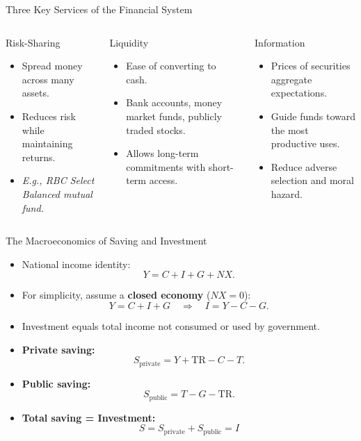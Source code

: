 \documentclass[aspectratio=169]{beamer}
\begin{document}
\begin{frame}{Three Key Services of the Financial System}
\transfade
\begin{columns}
\begin{block}{\centering \textcolor{accent}{Risk-Sharing}}
\begin{itemize}
  \item Spread money across many assets.
  \item Reduces risk while maintaining returns.
  \item \textit{E.g., RBC Select Balanced mutual fund.}
\end{itemize}
\end{block}
\begin{block}{\centering \textcolor{leafgreen}{Liquidity}}
\begin{itemize}
  \item Ease of converting to cash.
  \item Bank accounts, money market funds, publicly traded stocks.
  \item Allows long-term commitments with short-term access.
\end{itemize}
\end{block}
\begin{block}{\centering \textcolor{deeporange}{Information}}
\begin{itemize}
  \item Prices of securities aggregate expectations.
  \item Guide funds toward the most productive uses.
  \item Reduce adverse selection and moral hazard.
\end{itemize}
\end{block}
\end{columns}
\end{frame}


\begin{frame}{The Macroeconomics of Saving and Investment}
\transfade
\begin{itemize}
  \item National income identity:
  \[
    Y = C + I + G + NX.
  \]
  \item For simplicity, assume a \textbf{closed economy} ($NX = 0$):
  \[
    Y = C + I + G \quad \Rightarrow \quad I = Y - C - G.
  \]
  \item Investment equals total income not consumed or used by government.
  \item \textbf{Private saving:}
  \[
    S_{\text{private}} = Y + \text{TR} - C - T.
  \]
  \item \textbf{Public saving:}
  \[
    S_{\text{public}} = T - G - \text{TR}.
  \]
  \item \textbf{Total saving = Investment:}
  \[
    \boxed{S = S_{\text{private}} + S_{\text{public}} = I}
  \]
\end{itemize}
\end{frame}
\end{document}
